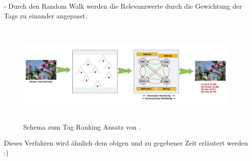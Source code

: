 - Durch den Random Walk werden die Relevanzwerte durch die Gewichtung der Tags zu einander angepasst.




\begin{figure}[htbp]
  \centering
    \includegraphics[height=2in]{images/tag_ranking_verfahren.png}
  \caption{Schema zum Tag Ranking Ansatz von \cite{ranking}.}
  \label{fig:images_tag_ranking_verfahren}
\end{figure}


Dieses Verfahren wird ähnlich dem obigen und zu gegebener Zeit erläutert werden :)


